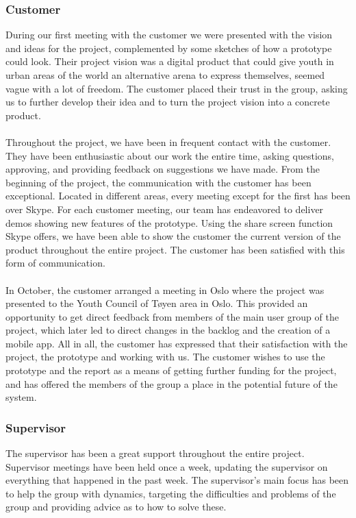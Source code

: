 \subsubsection{Customer} During our first meeting with the customer we were presented with the vision and ideas for the project, complemented by some sketches of how a prototype could look. Their project vision was a digital product that could give youth in urban areas of the world an alternative arena to express themselves, seemed vague with a lot of freedom. The customer placed their trust in the group, asking us to further develop their idea and to turn the project vision into a concrete product.
\paragraph{} Throughout the project, we have been in frequent contact with the customer. They have been enthusiastic about our work the entire time, asking questions, approving, and providing feedback on suggestions we have made. From the beginning of the project, the communication with the customer has been exceptional. Located in different areas, every meeting except for the first has been over Skype. For each customer meeting, our team has endeavored to deliver demos showing new features of the prototype. Using the share screen function Skype offers, we have been able to show the customer the current version of the product throughout the entire project. The customer has been satisfied with this form of communication.
\paragraph{} In October, the customer arranged a meeting in Oslo where the project was presented to the Youth Council of T{\o}yen area in Oslo. This provided an opportunity to get direct feedback from members of the main user group of the project, which later led to direct changes in the backlog and the creation of a mobile app. All in all, the customer has expressed that their satisfaction with the project, the prototype and working with us. The customer wishes to use the prototype and the report as a means of getting further funding for the project, and has offered the members of the group a place in the potential future of the system.
\subsubsection{Supervisor} The supervisor has been a great support throughout the entire project. Supervisor meetings have been held once a week, updating the supervisor on everything that happened in the past week. The supervisor's main focus has been to help the group with dynamics, targeting the difficulties and problems of the group and providing advice as to how to solve these. 

